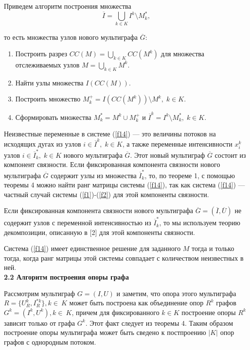 \documentclass[14pt]{extarticle}%
\begin{document}
Приведем алгоритм построения множества $$\overline I=\bigcup_{k\in K}I^k\setminus M^*_k,$$

то есть множества узлов нового мультиграфа $\overline G$:
\begin{enumerate}
    \item Построить разрез $CC(M)=\bigcup_{k\in K}CC(M^k)$ для множества отслеживаемых узлов $M=\bigcup_{k\in K}M^k$.
    \item Найти узлы множества $I(CC(M))$.
    \item Построить множество $M^+_k=I(CC(M^k))\setminus M^k,\; k\in K$.
    \item Сформировать множества $M^*_k=M^k\cup M^+_k$ и $\overline I^k=I^k\setminus M^*_k,\;k\in K$.
\end{enumerate}

Неизвестные переменные в системе (\ref{f14}) --- это величины потоков на исходящих дугах из узлов $i\in \overline I^k,\;k\in K$, а также переменные интенсивности $x^k_i$ узлов $i\in\overline I^*_k, \;k\in K$ нового мультиграфа $\overline G$. Этот новый мультиграф $\overline G$ состоит из компонент связности. Если фиксированная компонента связности нового мультиграфа $\overline G$ содержит узлы из множества $\overline I^*_k$, то, по теореме 1, с помощью теоремы 4 можно найти ранг матрицы системы (\ref{f14}), так как система (\ref{f14}) --- частный случай системы (\ref{f1})-(\ref{f2}) для этой компоненты связности.

Если фиксированная компонента связности нового мультиграфа $\overline G=(\overline I, \overline U)$ не содержит узлов с переменной интенсивностью из $\overline I^*_k$, то мы используем теорию декомпозиции, описанную в [2] для этой компоненты связности.

Система (\ref{f14}) имеет единственное решение для заданного $M$ тогда и только тогда, когда ранг матрицы этой системы совпадает с количеством неизвестных в ней.\\

\textbf{2.2 Алгоритм построения опоры графа}

Рассмотрим мультиграф $G=(I,U)$ и заметим, что опора этого мультиграфа $R=\{U^k_R, I^{*k}_R\}, k\in~K$  может быть построена как объединение опор $R^k$ графов $G^k=(I^k, U^k), k\in~K$, причем для фиксированного $k\in K$ построение опоры $R^k$ зависит только от графа $G^k$. Этот факт следует из теоремы 4. Таким образом построение опоры мультиграфа может быть сведено к постпроению $|K|$ опор графов с однородным потоком. 
\end{document}
